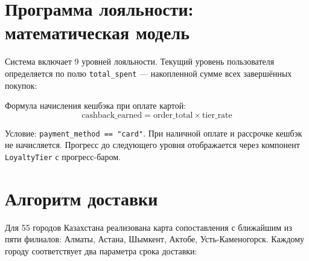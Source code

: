 \documentclass[14pt,a4paper]{extreport}
\begin{document}
\section{Программа лояльности: математическая модель}

Система включает 9 уровней лояльности. Текущий уровень пользователя определяется по полю \texttt{total\_spent} — накопленной сумме всех завершённых покупок:

\begin{table}[h!]
\centering
\caption{Уровни программы лояльности (актуальные значения)}
\end{table}

Формула начисления кешбэка при оплате картой:
\begin{equation}
  \text{cashback\_earned} = \text{order\_total} \times \text{tier\_rate}
\end{equation}

Условие: \texttt{payment\_method == "card"}. При наличной оплате и рассрочке кешбэк не начисляется. Прогресс до следующего уровня отображается через компонент \texttt{LoyaltyTier} с прогресс-баром.

\section{Алгоритм доставки}

Для 55 городов Казахстана реализована карта сопоставления с ближайшим из пяти филиалов: Алматы, Астана, Шымкент, Актобе, Усть-Каменогорск. Каждому городу соответствует два параметра срока доставки:
\end{document}
